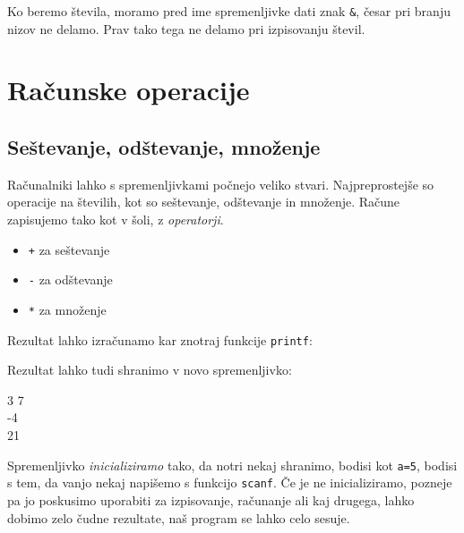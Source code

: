 \documentclass{book}
\begin{document}
\begin{errors}
Ko beremo števila, moramo pred ime spremenljivke dati znak \verb+&+, česar pri branju nizov ne delamo. Prav tako tega ne delamo pri izpisovanju števil.
\end{errors}

\chapter{Računske operacije}

\section{Seštevanje, odštevanje, množenje}
Računalniki lahko s spremenljivkami počnejo veliko stvari. Najpreprostejše so  operacije na številih, kot so seštevanje, odštevanje in množenje. Račune zapisujemo tako kot v šoli, z \emph{operatorji}.
\begin{itemize}
	\item \verb-+- za seštevanje
	\item \verb+-+ za odštevanje
	\item \verb+*+ za množenje
\end{itemize}

\begin{examples}
Rezultat lahko izračunamo kar znotraj funkcije \verb+printf+:


\begin{inout}

\end{inout}

\end{examples}

\begin{examples}
Rezultat lahko tudi shranimo v novo spremenljivko:


\begin{inout}
3 7
\\
-4\\
21
\end{inout}

\end{examples}

\begin{errors}
Spremenljivko \emph{inicializiramo} tako, da notri nekaj shranimo, bodisi kot \verb+a=5+, bodisi s tem, da vanjo nekaj napišemo s funkcijo \verb+scanf+.
Če je ne inicializiramo, pozneje pa jo poskusimo uporabiti za izpisovanje, računanje ali kaj drugega, lahko dobimo zelo čudne rezultate, naš program se lahko celo sesuje.
\end{errors}
\end{document}
